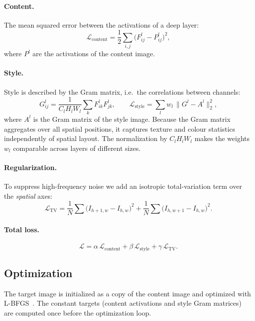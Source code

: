 \documentclass[12pt,a4paper]{article}
\begin{document}
\paragraph{Content.} The mean squared error between the activations of a deep
layer:
\begin{equation}
\mathcal{L}_{\text{content}} = \frac{1}{2}\sum_{i,j}\bigl(F^{l}_{ij}-P^{l}_{ij}\bigr)^{2},
\end{equation}
where $P^l$ are the activations of the content image.

\paragraph{Style.} Style is described by the Gram matrix, i.e.\ the correlations
between channels:
\begin{equation}
G^{l}_{ij} = \frac{1}{C_l H_l W_l}\sum_{k} F^{l}_{ik}F^{l}_{jk},
\qquad
\mathcal{L}_{\text{style}} = \sum_{l} w_l \,\bigl\| G^{l}-A^{l}\bigr\|_2^2,
\end{equation}
where $A^l$ is the Gram matrix of the style image. Because the Gram matrix
aggregates over all spatial positions, it captures texture and colour statistics
independently of spatial layout. The normalization by $C_l H_l W_l$ makes the
weights $w_l$ comparable across layers of different sizes.

\paragraph{Regularization.} To suppress high-frequency noise we add an isotropic
total-variation term over the \emph{spatial} axes:
\begin{equation}
\mathcal{L}_{\text{TV}} = \frac{1}{N}\sum\bigl(I_{h+1,w}-I_{h,w}\bigr)^2
                        + \frac{1}{N}\sum\bigl(I_{h,w+1}-I_{h,w}\bigr)^2 .
\end{equation}

\paragraph{Total loss.}
\begin{equation}
\mathcal{L} = \alpha\,\mathcal{L}_{\text{content}}
            + \beta\,\mathcal{L}_{\text{style}}
            + \gamma\,\mathcal{L}_{\text{TV}} .
\end{equation}

\subsection{Optimization}
The target image is initialized as a copy of the content image and optimized
with L-BFGS~\cite{liu1989lbfgs}. The constant targets (content activations and
style Gram matrices) are computed once before the optimization loop.
\end{document}

